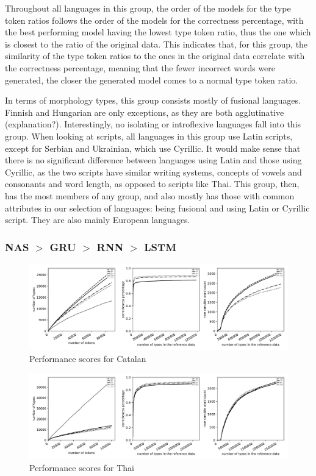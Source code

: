 \documentclass[11pt,a4paper,twoside,openright]{scrbook}
\begin{document}
Throughout all languages in this group, the order of the models for the type token ratios follows the order of the models for the correctness percentage, with the best performing model having the lowest type token ratio, thus the one which is closest to the ratio of the original data. This indicates that, for this group, the similarity of the type token ratios to the ones in the original data correlate with the correctness percentage, meaning that the fewer incorrect words were generated, the closer the generated model comes to a normal type token ratio. 

In terms of morphology types, this group consists mostly of fusional languages. Finnish and Hungarian are only exceptions, as they are both agglutinative (explanation?). Interestingly, no isolating or introflexive languages fall into this group. When looking at scripts, all languages in this group use Latin scripts, except for Serbian and Ukrainian, which use Cyrillic. It would make sense that there is no significant difference between languages using Latin and those using Cyrillic, as the two scripts have similar writing systems, concepts of vowels and consonants and word length, as opposed to scripts like Thai. This group, then, has the most members of any group, and also mostly has those with common attributes in our selection of languages: being fusional and using Latin or Cyrillic script. They are also mainly European languages.


\subsubsection{NAS $>$ GRU $>$ RNN $>$ LSTM}
\begin{figure}
\centering
\includegraphics[width=\textwidth]{graphs/ca_all_graphs}
\caption{Performance scores for Catalan}
\label{Figure:ca_all_graphs}
\end{figure}
\begin{figure}
\centering
\includegraphics[width=\textwidth]{graphs/th_all_graphs}
\caption{Performance scores for Thai}
\label{Figure:th_all_graphs}
\end{figure}
\end{document}

